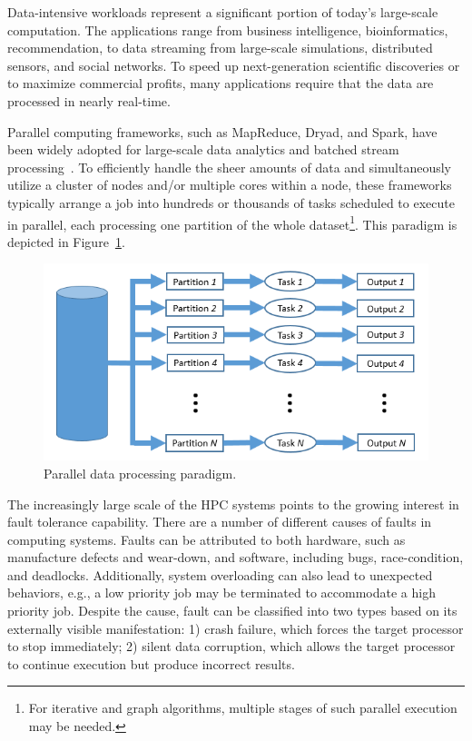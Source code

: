Data-intensive workloads represent a significant portion of today's large-scale computation. The applications range from business intelligence, bioinformatics, recommendation, to data streaming from large-scale simulations, distributed sensors, and social networks. To speed up next-generation scientific discoveries or to maximize commercial profits, many applications require that the data are processed in nearly real-time. 

Parallel computing frameworks, such as MapReduce, Dryad, and Spark, have been widely adopted for large-scale data analytics and batched stream processing~\cite{Dean2004,Isard2007,Zaharia180560,Bhatotia2011}. To efficiently handle the sheer amounts of data and simultaneously utilize a cluster of nodes and/or multiple cores within a node, these frameworks typically arrange a job into hundreds or thousands of tasks scheduled to execute in parallel, each processing one partition of the whole dataset\footnote{For iterative and graph algorithms, multiple stages of such parallel execution may be needed.}. This paradigm is depicted in Figure~\ref{fig:engine}.

\begin{figure}[!t]
  \begin{center}
      \includegraphics[width=\columnwidth]{figures/engine}
  \end{center}
  \vskip -0.1in
  \caption{Parallel data processing paradigm.}
  \label{fig:engine}
\end{figure}

The increasingly large scale of the HPC systems points to the growing interest in fault tolerance capability. There are a number of different causes of faults in computing systems. Faults can be attributed to both hardware, such as manufacture defects and wear-down, and software, including bugs, race-condition, and deadlocks. Additionally, system overloading can also lead to unexpected behaviors, e.g., a low priority job may be terminated to accommodate a high priority job. Despite the cause, fault can be classified into two types based on its externally visible manifestation: 1) crash failure, which forces the target processor to stop immediately; 2) silent data corruption, which allows the target processor to continue execution but produce incorrect results.  

